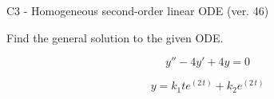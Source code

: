 \begin{exercise}
  \begin{exerciseTitle}C3 - Homogeneous second-order linear ODE (ver. 46)\end{exerciseTitle}
  \begin{exerciseStatement}
    
Find the general solution to the given ODE.

    
\[y''-4y'+4y = 0\]

  \end{exerciseStatement}
  \begin{exerciseAnswer}
    
\[y= k_{1} t e^{\left(2 \, t\right)} + k_{2} e^{\left(2 \, t\right)}\]

  \end{exerciseAnswer}
\end{exercise}